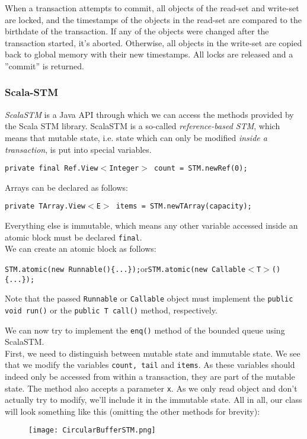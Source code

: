 \documentclass[main]{subfiles}
\begin{document}
When a transaction attempts to commit, all objects of the read-set and write-set are locked, and the timestamps of the objects in the read-set are compared to the birthdate of the transaction. If any of the objects were changed after the transaction started, it's aborted. Otherwise, all objects in the write-set are copied back to global memory with their new timestamps. All locks are released and a ''commit'' is returned.

\subsubsection{Scala-STM}
\textit{ScalaSTM} is a Java API through which we can access the methods provided by the Scala STM library. ScalaSTM is a so-called \textit{reference-based STM}, which means that mutable state, i.e. state which can only be modified \textit{inside a transaction}, is put into special variables.
\begin{center}
    \texttt{private final Ref.View$<$Integer$>$ count = STM.newRef(0);}
\end{center}
Arrays can be declared as follows:
\begin{center}
    \texttt{private TArray.View$<$E$>$ items = STM.newTArray(capacity);}
\end{center}
Everything else is immutable, which means any other variable accessed inside an atomic block must be declared \texttt{final}.\\[3mm]
We can create an atomic block as follows:
\begin{center}
    \texttt{STM.atomic(new Runnable()\{...\});}\quad or\quad \texttt{STM.atomic(new Callable$<$T$>$()\{...\});}
\end{center}
Note that the passed \texttt{Runnable} or \texttt{Callable} object must implement the \texttt{public void run()} or the \texttt{public T call()} method, respectively.\\[3mm]
\begin{example}
    We can now try to implement the \texttt{enq()} method of the bounded queue using ScalaSTM.\\[3mm]
    First, we need to distinguish between mutable state and immutable state. We see that we modify the variables \texttt{count, tail} and \texttt{items}. As these variables should indeed only be accessed from within a transaction, they are part of the mutable state. The method also accepts a parameter \texttt{x}. As we only read object and don't actually try to modify, we'll include it in the immutable state. All in all, our class will look something like this (omitting the other methods for brevity): 
    \begin{figure}[H]
        \centering
        \texttt{[image: CircularBufferSTM.png]}
    \end{figure}
    
\end{example}
\end{document}
